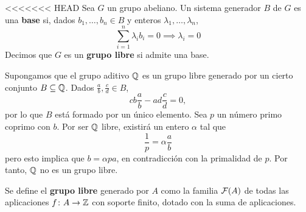 \begin{definition}
<<<<<<< HEAD
	Sea $G$ un grupo abeliano.
	Un sistema generador $B$ de $G$ es una \textbf{base} si, dados $b_1,\dots,b_n \in B$ y enteros $\lambda_1,\dots,\lambda_n$,
	\begin{equation}
		\label{SisLibre} \sum^n_{i=1}\lambda_ib_i=0 \implies \lambda_i=0
	\end{equation}
	Decimos que $G$ es un \textbf{grupo libre} si admite una base.
\end{definition}

\begin{example}
	Supongamos que el grupo aditivo $\mathbb{Q}$ es un grupo libre generado por un cierto conjunto $B \subseteq \mathbb{Q}$.
	Dados $\frac{a}{b}, \frac{c}{d} \in B$,
		\[cb\frac{a}{b}-ad\frac{c}{d}=0,\]
	por lo que $B$ está formado por un único elemento.
	Sea $p$ un número primo coprimo con $b$.
	Por ser $\mathbb{Q}$ libre, existirá un entero $\alpha$ tal que
		\[\frac{1}{p}=\alpha\frac{a}{b}\]
	pero esto implica que $b=\alpha pa$, en contradicción con la primalidad de $p$.
	Por tanto, $\mathbb{Q}$ no es un grupo libre.
\end{example}


Se define el \textbf{grupo libre} generado por $A$ como la familia $\mathcal{F}(A)$ de todas las aplicaciones $f\colon A \to \mathbb{Z}$ con soporte finito, dotado con la suma de aplicaciones.

